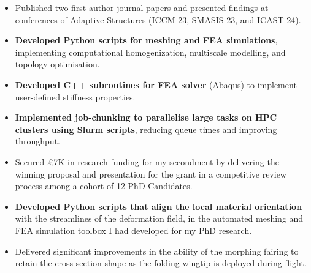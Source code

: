 \documentclass[10pt,a4paper,ragged2e, normalphoto]{altacv}
\begin{document}
\begin{itemize}
    \item Published two first-author journal papers and presented findings at conferences of Adaptive Structures (ICCM 23, SMASIS 23, and ICAST 24).
    \item \textbf{Developed Python scripts for meshing and FEA simulations}, implementing computational homogenization, multiscale modelling, and topology optimisation.
    \item \textbf{Developed C++ subroutines for FEA solver} (Abaqus) to implement user-defined stiffness properties.
    \item \textbf{Implemented job-chunking to parallelise large tasks on HPC clusters using Slurm scripts}, reducing queue times and improving throughput.
\end{itemize}
\vspace{-0.35em}
\divider


\begin{itemize}
    \item Secured £7K in research funding for my secondment by delivering the winning proposal and presentation for the grant in a competitive review process among a cohort of 12 PhD Candidates.
    \item \textbf{Developed Python scripts that align the local material orientation} with the streamlines of the deformation field, in the automated meshing and FEA simulation toolbox I had developed for my PhD research.
    \item Delivered significant improvements in the ability of the morphing fairing to retain the cross-section shape as the folding wingtip is deployed during flight.
\end{itemize}
\vspace{-0.35em}
\end{document}
